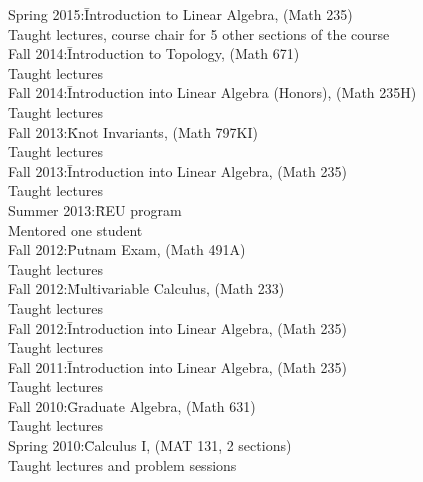 \documentclass[11pt]{amsart}
\theoremstyle{plain}
\theoremstyle{definition}
\theoremstyle{remark}
\begin{document}
\begin{tabbing}
Spring 2015:\quad\quad\= Introduction to Linear Algebra, (Math 235)\\
\>Taught lectures, course chair for 5 other sections of the course\\


Fall 2014:\quad\quad\quad\= Introduction to Topology, (Math 671)\\
\>Taught lectures \\


Fall 2014:\quad\quad\quad\= Introduction into Linear Algebra (Honors), (Math 235H)\\
\>Taught lectures \\



Fall 2013:\quad\quad\quad\= Knot Invariants, (Math 797KI)\\
\>Taught lectures \\


Fall 2013:\quad\quad\quad\= Introduction into Linear Algebra, (Math 235)\\
\>Taught lectures \\


Summer 2013:\quad\= REU program\\
\>Mentored one student \\


Fall 2012:\quad\quad\quad\= Putnam Exam, (Math 491A)\\
\>Taught lectures \\

Fall 2012:\quad\quad\quad\= Multivariable Calculus, (Math 233)\\
\>Taught lectures \\

Fall 2012:\quad\quad\quad\= Introduction into Linear Algebra, (Math 235)\\
\>Taught lectures \\

Fall 2011:\quad\quad\quad\= Introduction into Linear Algebra, (Math 235)\\
\>Taught lectures \\
Fall 2010:\quad\quad\quad\= Graduate Algebra, (Math 631)\\
\>Taught lectures \\
Spring 2010:\quad\quad\= Calculus I, (MAT 131, 2 sections)\\
 \>Taught lectures and problem sessions\\
\end{tabbing}
\end{document}
